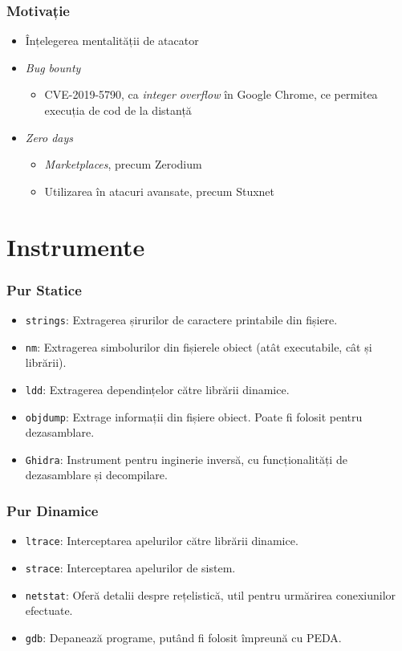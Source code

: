 \documentclass[xcolor={table}]{beamer}
\begin{document}
	\begin{frame}
		\frametitle{Motivație}\pause
		\begin{itemize}[<+->]
		    \item Înțelegerea mentalității de atacator
		    \item \textit{Bug bounty}
    		    \begin{itemize}
    		        \item CVE-2019-5790, ca \textit{integer overflow} în Google Chrome, ce permitea execuția de cod de la distanță
    		    \end{itemize}
		    \item \textit{Zero days}
		        \begin{itemize}
    		        \item \textit{Marketplaces}, precum Zerodium
    		        \item Utilizarea în atacuri avansate, precum Stuxnet
    		    \end{itemize}
		\end{itemize}
	\end{frame}
	
	\section{Instrumente}
	
	\begin{frame}
		\frametitle{Pur Statice}\pause
		\begin{itemize}[<+->]
		    \item \texttt{strings}: Extragerea șirurilor de caractere printabile din fișiere.
		    \item \texttt{nm}: Extragerea simbolurilor din fișierele obiect (atât executabile, cât și librării).
		    \item \texttt{ldd}: Extragerea dependințelor către librării dinamice.
		    \item \texttt{objdump}: Extrage informații din fișiere obiect. Poate fi folosit pentru dezasamblare.
		    \item \texttt{Ghidra}: Instrument pentru inginerie inversă, cu funcționalități de dezasamblare și decompilare.
	    \end{itemize}
	\end{frame}
	
	\begin{frame}
		\frametitle{Pur Dinamice}\pause
		\begin{itemize}[<+->]
		    \item \texttt{ltrace}: Interceptarea apelurilor către librării dinamice.
		    \item \texttt{strace}: Interceptarea apelurilor de sistem.
		    \item \texttt{netstat}: Oferă detalii despre rețelistică, util pentru urmărirea conexiunilor efectuate.
		    \item \texttt{gdb}: Depanează programe, putând fi folosit împreună cu PEDA.
	    \end{itemize}
	\end{frame}
	
\end{document}
